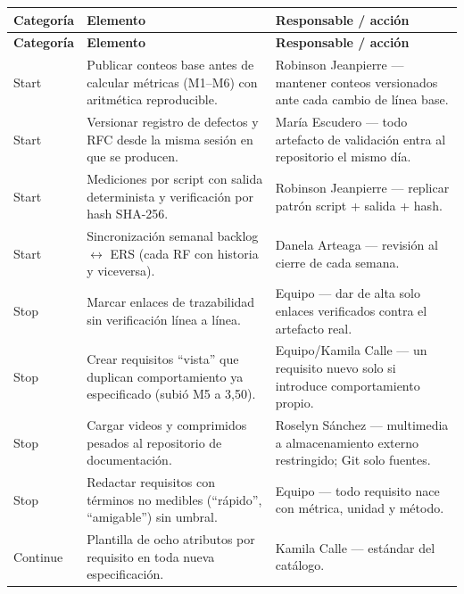 \begin{center}
\begin{longtable}{|p{1.9cm}|p{7.2cm}|p{4.9cm}|}
\hline
\textbf{Categor\'ia} & \textbf{Elemento} & \textbf{Responsable / acci\'on} \\
\hline
\endfirsthead
\hline
\textbf{Categor\'ia} & \textbf{Elemento} & \textbf{Responsable / acci\'on} \\
\hline
\endhead
\hline
\endfoot
\hline
\endlastfoot

Start & Publicar conteos base antes de calcular m\'etricas (M1--M6) con aritm\'etica reproducible. & Robinson Jeanpierre --- mantener conteos versionados ante cada cambio de l\'inea base. \\ \hline

Start & Versionar registro de defectos y RFC desde la misma sesi\'on en que se producen. & Mar\'ia Escudero --- todo artefacto de validaci\'on entra al repositorio el mismo d\'ia. \\ \hline

Start & Mediciones por script con salida determinista y verificaci\'on por hash SHA-256. & Robinson Jeanpierre --- replicar patr\'on script + salida + hash. \\ \hline

Start & Sincronizaci\'on semanal backlog $\leftrightarrow$ ERS (cada RF con historia y viceversa). & Danela Arteaga --- revisi\'on al cierre de cada semana. \\ \hline

Stop & Marcar enlaces de trazabilidad sin verificaci\'on l\'inea a l\'inea. & Equipo --- dar de alta solo enlaces verificados contra el artefacto real. \\ \hline

Stop & Crear requisitos ``vista'' que duplican comportamiento ya especificado (subi\'o M5 a 3,50). & Equipo/Kamila Calle --- un requisito nuevo solo si introduce comportamiento propio. \\ \hline

Stop & Cargar videos y comprimidos pesados al repositorio de documentaci\'on. & Roselyn S\'anchez --- multimedia a almacenamiento externo restringido; Git solo fuentes. \\ \hline

Stop & Redactar requisitos con t\'erminos no medibles (``r\'apido'', ``amigable'') sin umbral. & Equipo --- todo requisito nace con m\'etrica, unidad y m\'etodo. \\ \hline

Continue & Plantilla de ocho atributos por requisito en toda nueva especificaci\'on. & Kamila Calle --- est\'andar del cat\'alogo. \\ \hline


\end{longtable}
\end{center}
